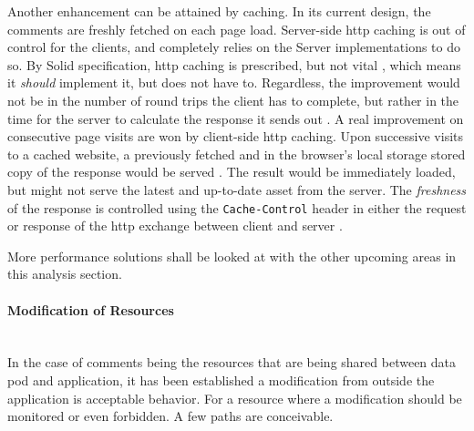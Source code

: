 Another enhancement can be attained by caching. In its current design, the comments are freshly fetched on each page load. Server-side \gls{http} caching is out of control for the clients, and completely relies on the Server implementations to do so. By Solid specification, \gls{http} caching is prescribed, but not vital \cite{solid-protocol}, which means it \textit{should} implement it, but does not have to. Regardless, the improvement would not be in the number of round trips the client has to complete, but rather in the time for the server to calculate the response it sends out \cite{http-caching}. A real improvement on consecutive page visits are won by client-side \gls{http} caching. Upon successive visits to a cached website, a previously fetched and in the browser's local storage stored copy of the response would be served \cite{http-caching}. The result would be immediately loaded, but might not serve the latest and up-to-date asset from the server. The \textit{freshness} of the response is controlled using the \texttt{Cache-Control} header in either the request or response of the \gls{http} exchange between client and server \cite{http-caching}. 

More performance solutions shall be looked at with the other upcoming areas in this analysis section.
\vspace{0.5cm}
\paragraph{Modification of Resources}\mbox{}\\

In the case of comments being the resources that are being shared between data pod and application, it has been established a modification from outside the application is acceptable behavior. For a resource where a modification should be monitored or even forbidden. A few paths are conceivable.

